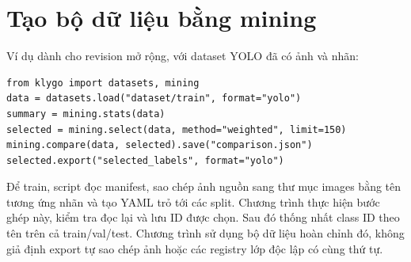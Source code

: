\clearpage
\section{Tạo bộ dữ liệu bằng mining}
Ví dụ dành cho revision mở rộng, với dataset YOLO đã có ảnh và nhãn:
\begin{lstlisting}[caption={Chọn tập dữ liệu và xuất annotation cùng manifest}]
from klygo import datasets, mining
data = datasets.load("dataset/train", format="yolo")
summary = mining.stats(data)
selected = mining.select(data, method="weighted", limit=150)
mining.compare(data, selected).save("comparison.json")
selected.export("selected_labels", format="yolo")
\end{lstlisting}
Để train, script đọc manifest, sao chép ảnh nguồn sang thư mục images bằng tên tương ứng nhãn và tạo YAML trỏ tới các split. Chương trình  thực hiện bước ghép này, kiểm tra đọc lại và lưu ID được chọn. Sau đó  thống nhất class ID theo tên trên cả train/val/test. Chương trình  sử dụng bộ dữ liệu hoàn chỉnh đó, không giả định export tự sao chép ảnh hoặc các registry lớp độc lập có cùng thứ tự.
